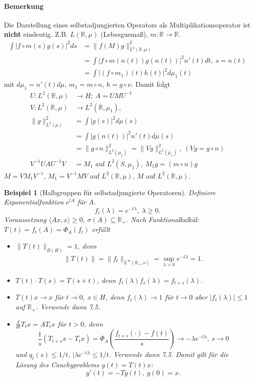 \documentclass[12pt]{extreport} %
\newtheorem{Beispiel}[Satz]{Beispiel}
\numberwithin{equation}{section}
\newcommand{\R}{\mathbb{R}} %
\newcommand{\m}{\cdot}
\begin{document}
	\paragraph{Bemerkung}
		Die Darstellung eines selbstadjungierten Operators als Multiplikationsoperator ist \textbf{nicht} eindeutig. Z.B. $L(\R,\mu)$ (Lebesguemaß), $m\colon \R\rightarrow \R$. 
		\begin{align*}
			\int |f\circ m(s)g(s)|^2 ds &= \|f(M)g\|_{L^2(\R, \mu)}^2\\
			&=\int |f\circ m (n(t))g(n(t))|^2 n'(t)dt, ~s = n(t)\\
			&= \int |(f\circ m_1)(t) h(t)|^2 d\mu_1(t)
		\end{align*}
		mit $d\mu_1 = n'(t)d\mu$, $m_1 = m\circ n$, $h = g\circ\nu$. Damit folgt
		\begin{align*}
			U\colon L^2(\R,\mu)&\rightarrow H;~ A= UMU^{-1}\\
			V\colon L^2(\R,\mu)&\rightarrow L^2(\R, \mu_1), \\%
			\|g\|_{L^2(\mu)}^2 &= \int |g(s)|^2d\mu(s)\\
			&=\int |g(n(t))|^2n'(t)d\mu(s)\\
			&= \|g\circ n\|_{L^2(\mu_1)}^2 = \|Vg\|_{L^2(\mu_1)}^2,~ (Vg = g\circ n)\\
			V^{-1}UAU^{-1}V &= M_1 \text{ auf } L^2(S,\mu_1),~ M_1g = (m\circ n)g
		\end{align*}
		$M = VM_1V^{-1}$, $M_1 = V^{-1}M V$ auf $L^2(\R,\mu)$, $M$ auf $L^2(\R,\mu)$.
		
		
	\begin{Beispiel}[Halbgruppen für selbstadjungierte Operatoren]
		Definiere Exponentialfunktion $e^{tA}$  für $A$.
		$$f_t(\lambda) = e^{-t\lambda},~ \lambda\geq 0.$$
		Voraussetzung $\langle Ax, x\rangle \geq 0$, $\sigma(A)\subseteq \R_+$. Nach Funktionalkalkül: $T(t) = f_t(A) = \Phi_A(f_t)$ erfüllt
		\begin{itemize}
			\item $\|T(t)\|_{B(H)} = 1$, denn 
			\begin{align*}
				\|T(t)\| = \|f_t\|_{L^\infty(\R_+,\nu)} = \sup_{\lambda> 0}e^{-t\lambda} = 1.
			\end{align*}
			\item $T(t)\m T(s) = T(s+t)$, denn $f_t(\lambda)f_s(\lambda) = f_{t+s}(\lambda)$.
			\item $T(t)x\rightarrow x$ für $t\rightarrow 0$, $x\in H$, denn $f_t(\lambda)\rightarrow 1$ für $t\rightarrow 0$ aber $|f_t(\lambda)|\leq 1$ auf $\R_+$. Verwende dann 7.5.
			\item $\frac{d}{dt}T_t x = AT_tx$ für $t>0$, denn 
			$$\frac{1}{s}(T_{t+s}x - T_t x) = \Phi_A\left(\frac{f_{t+s}(\m) - f(t)}{s}\right)\rightarrow -\lambda e^{-t\lambda},~ s\rightarrow0$$
			und $q_t(s) \leq 1/t$, $|\lambda e^{-t\lambda} \leq 1/t$. Verwende dann 7.5. Damit gilt für die Lösung des Cauchyproblems $y(t) = T(t)x$:
			$$y'(t) = -Ty(t),~ y(0) = x.$$
		\end{itemize}
	\end{Beispiel}
	
\end{document}
